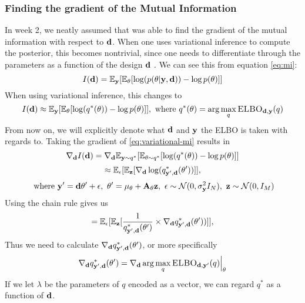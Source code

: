 \subsubsection{Finding the gradient of the Mutual Information}
In week 2, we neatly assumed that  was able to find the gradient 
of the mutual information with respect to $\mathbf{d}$. 
When one uses variational inference to compute the posterior, this becomes nontrivial, since one needs to differentiate through the parameters as a function of the design $\mathbf{d}$ \cite{lorraine19}.
We can see this from equation \ref{eq:mi}:
\begin{equation}I(\mathbf{d}) = \mathbb{E}_{\mathbf{y}}[\mathbb{E}_{\mathbf{\theta}}[\log (p(\theta | \mathbf{y}, \mathbf{d})) - \log p(\theta)]]\end{equation} 
When using variational inference, this changes to
\begin{equation}\label{eq:variational-mi}I(\mathbf{d}) \approx \mathbb{E}_{\mathbf{y}}[\mathbb{E}_{\mathbf{\theta}}[\log (q^*(\theta)) - \log p(\theta)]],\ \textrm{where}\ q^*(\theta) = \arg \max_q \textsc{ELBO}_{\mathbf{d}, \mathbf{y}}(q)\end{equation}
From now on, we will explicitly denote what $\mathbf{d}$ and $\mathbf{y}$ the ELBO is taken with regards to.
Taking the gradient of \eqref{eq:variational-mi} results in
\begin{equation}\nabla_{\mathbf{d}} I(\mathbf{d}) = \nabla_{\mathbf{d}}\mathbb{E}_{\mathbf{y} \sim q^*}[\mathbb{E}_{\mathbf{\theta}\sim q^*}[\log (q^*(\theta)) - \log p(\theta)]]\label{eq:var-mi-reparam}\end{equation}
$$ \approx \mathbb{E}_{\mathbf{\epsilon}}[\mathbb{E}_{\mathbf{z}}[\nabla_{\mathbf{d}}\log (q^*_{\mathbf{y}', \mathbf{d}}(\theta'))]],$$
$$\ \textrm{where}\ \mathbf{y}' = \mathbf{d}\theta' + \epsilon,\ \theta' = \mu_\theta + \mathbf{A}_\theta\mathbf{z},\ \epsilon \sim \mathcal{N}(0, \sigma^2_{\mathbf{y}} I_N),\ \mathbf{z} \sim \mathcal{N}(0, I_M)$$
Using the chain rule gives us
\begin{equation}
  = \mathbb{E}_{\mathbf{\epsilon}}[\mathbb{E}_{\mathbf{z}}[\frac{1}{q^*_{\mathbf{y}', \mathbf{d}}(\theta')} \times \nabla_{\mathbf{d}} q^*_{\mathbf{y}', \mathbf{d}}(\theta'))]],
  \label{eq:variational-mi-2}
\end{equation}
Thus we need to calculate $\nabla_{\mathbf{d}} q^*_{\mathbf{y}', \mathbf{d}}(\theta')$, or more specifically
\begin{equation}
\nabla_{\mathbf{d}} q^*_{\mathbf{y}', \mathbf{d}}(\theta') = \nabla_{\mathbf{d}} \arg \max_q \textsc{ELBO}_{\mathbf{d}, \mathbf{y}'}(q)\Bigr\rvert_{\theta}
\end{equation}
If we let $\lambda$ be the parameters of $q$ encoded as a vector, we can regard $q^*$ as a function of $\mathbf{d}$.
